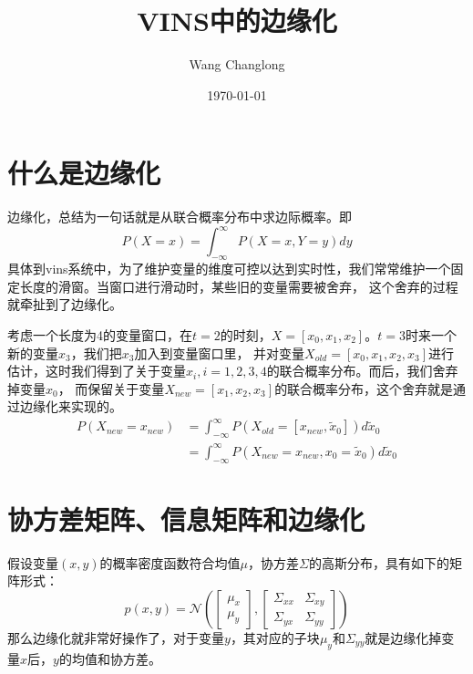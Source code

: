 \documentclass[a4pape,oneside,10pt]{article}
\begin{document}
\title{VINS中的边缘化}
\author{Wang Changlong}
\date{\ukdate\today}
\maketitle
\section{什么是边缘化}
边缘化，总结为一句话就是从联合概率分布中求边际概率。即
\begin{equation}
    P(X=x) = \int_{ -\infty}^{\infty}  P(X=x, Y=y) dy
\end{equation}
具体到vins系统中，为了维护变量的维度可控以达到实时性，我们常常维护一个固定长度的滑窗。当窗口进行滑动时，某些旧的变量需要被舍弃，
这个舍弃的过程就牵扯到了边缘化。

考虑一个长度为4的变量窗口，在$t=2$的时刻，$X=[x_0, x_1, x_2]$。$t=3$时来一个新的变量$x_3$，我们把$x_3$加入到变量窗口里，
并对变量$X_{old}=[x_0, x_1, x_2, x_3]$进行估计，这时我们得到了关于变量$x_i, i=1,2,3,4$的联合概率分布。而后，我们舍弃掉变量$x_0$，
而保留关于变量$X_{new}=[x_1, x_2, x_3]$的联合概率分布，这个舍弃就是通过边缘化来实现的。
\begin{equation}
\begin{aligned}
    P(X_{new}=x_{new}) 
    &= \int_{ -\infty}^{\infty}  P(X_{old}=[x_{new}, \tilde{x}_{0}]) d{\tilde{x}_0} \\
    &= \int_{ -\infty}^{\infty}  P(X_{new}=x_{new}, x_0=\tilde{x}_{0}) d{\tilde{x}_0}
\end{aligned}
\end{equation}

\section{协方差矩阵、信息矩阵和边缘化}
假设变量$(x,y)$的概率密度函数符合均值\textbf{$\mu$}，协方差\textbf{$\Sigma$}的高斯分布，具有如下的矩阵形式：
\begin{equation}
p(x,y) = \mathcal{N} (
    \begin{bmatrix}
        \textbf{$\mu_x$} \\
        \textbf{$\mu_y$}
    \end{bmatrix},
    \begin{bmatrix}
        \textbf{$\Sigma_{xx}$} & \textbf{$\Sigma_{xy}$} \\
        \textbf{$\Sigma_{yx}$} & \textbf{$\Sigma_{yy}$}
    \end{bmatrix} 
    )
\end{equation}
那么边缘化就非常好操作了，对于变量$y$，其对应的子块$\mu_y$和$\Sigma_{yy}$就是边缘化掉变量$x$后，$y$的均值和协方差。
\end{document}
